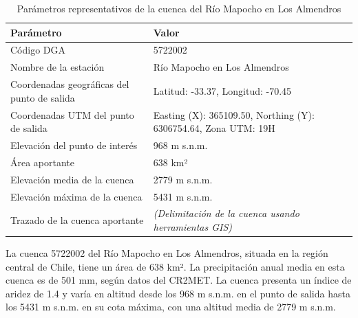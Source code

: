 \documentclass{article} %
\begin{document}
\begin{table}[h!]
\centering
\begin{tabular}{>{\raggedright}p{6cm} p{8cm}}
\toprule
\textbf{Parámetro} & \textbf{Valor} \\
\midrule
Código DGA & 5722002 \\
Nombre de la estación & Río Mapocho en Los Almendros \\
Coordenadas geográficas del punto de salida & Latitud: -33.37, Longitud: -70.45 \\
Coordenadas UTM del punto de salida & Easting (X): 365109.50, Northing (Y): 6306754.64, Zona UTM: 19H \\ 
Elevación del punto de interés & 968 m s.n.m. \\
Área aportante & 638 km² \\
Elevación media de la cuenca & 2779 m s.n.m. \\
Elevación máxima de la cuenca & 5431 m s.n.m. \\
Trazado de la cuenca aportante & \textit{(Delimitación de la cuenca usando herramientas GIS)} \\
\bottomrule
\end{tabular}
\caption{Parámetros representativos de la cuenca del Río Mapocho en Los Almendros}
\label{table:parameters}
\end{table}

La cuenca 5722002 del Río Mapocho en Los Almendros, situada en la región central de Chile, tiene un área de 638 km². La precipitación anual media en esta cuenca es de 501 mm, según datos del CR2MET. La cuenca presenta un índice de aridez de 1.4 y varía en altitud desde los 968 m s.n.m. en el punto de salida hasta los 5431 m s.n.m. en su cota máxima, con una altitud media de 2779 m s.n.m.
\end{document}
